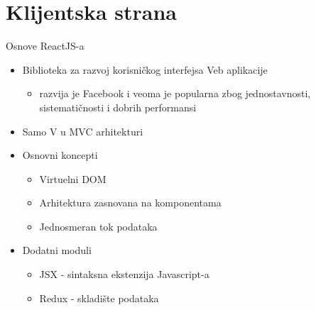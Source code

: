 \documentclass{beamer}
\begin{document}
\section{Klijentska strana}
\begin{frame}{Osnove ReactJS-a}
    \begin{itemize}
        \item Biblioteka za razvoj korisničkog interfejsa Veb aplikacije
        	\begin{itemize}
        \item razvija je Facebook i veoma je popularna zbog jednostavnosti, sistematičnosti i dobrih performansi
        	\end{itemize}
        \item Samo V u MVC arhitekturi
        \item Osnovni koncepti
        	\begin{itemize}
        		\item Virtuelni DOM
        		\item Arhitektura zasnovana na komponentama
        		\item Jednosmeran tok podataka
        	\end{itemize}
        \item Dodatni moduli
        \begin{itemize}
        	\item JSX - sintaksna ekstenzija Javascript-a
	        \item Redux - skladište podataka 
        \end{itemize}
    \end{itemize}
\end{frame}
\end{document}
